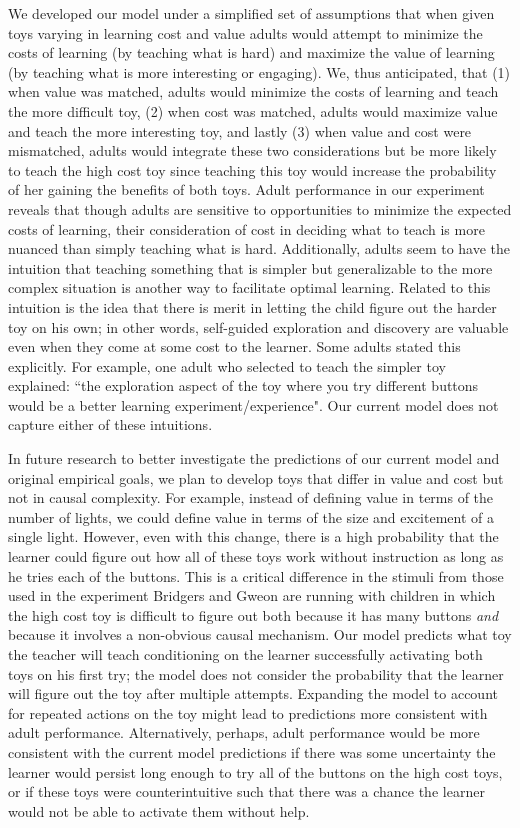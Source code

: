 \documentclass[10pt,letterpaper]{article}
\begin{document}
We developed our model under a simplified set of assumptions that when given toys varying in learning cost and value adults would attempt to minimize the costs of learning (by teaching what is hard) and maximize the value of learning (by teaching what is more interesting or engaging). We, thus anticipated, that (1) when value was matched, adults would minimize the costs of learning and teach the more difficult toy, (2) when cost was matched, adults would maximize value and teach the more interesting toy, and lastly (3) when value and cost were mismatched, adults would integrate these two considerations but be more likely to teach the high cost toy since teaching this toy would increase the probability of her gaining the benefits of both toys. Adult performance in our experiment reveals that though adults are sensitive to opportunities to minimize the expected costs of learning, their consideration of cost in deciding what to teach is more nuanced than simply teaching what is hard. Additionally, adults seem to have the intuition that teaching something that is simpler but generalizable to the more complex situation is another way to facilitate optimal learning. Related to this intuition is the idea that there is merit in letting the child figure out the harder toy on his own; in other words, self-guided exploration and discovery are valuable even when they come at some cost to the learner. Some adults stated this explicitly. For example, one adult who selected to teach the simpler toy explained: ``the exploration aspect of the toy where you try different buttons would be a better learning experiment/experience". Our current model does not capture either of these intuitions.

In future research to better investigate the predictions of our current model and original empirical goals, we plan to develop toys that differ in value and cost but not in causal complexity. For example, instead of defining value in terms of the number of lights, we could define value in terms of the size and excitement of a single light. However, even with this change, there is a high probability that the learner could figure out how all of these toys work without instruction as long as he tries each of the buttons. This is a critical difference in the stimuli from those used in the experiment Bridgers and Gweon are running with children in which the high cost toy is difficult to figure out both because it has many buttons \emph{and} because it involves a non-obvious causal mechanism. 
Our model predicts what toy the teacher will teach conditioning on the learner successfully activating both toys on his first try; the model does not consider the probability that the learner will figure out the toy after multiple attempts. 
Expanding the model to account for repeated actions on the toy might lead to predictions more consistent with adult performance.
Alternatively, perhaps, adult performance would be more consistent with the current model predictions if there was some uncertainty the learner would persist long enough to try all of the buttons on the high cost toys, or if these toys were counterintuitive such that there was a chance the learner would not be able to activate them without help.
\end{document}
